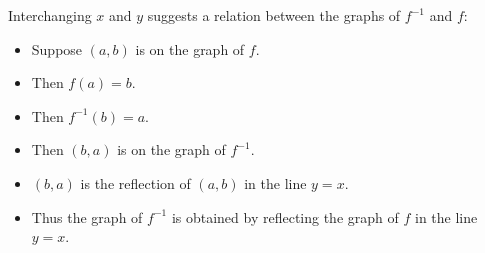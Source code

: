 \begin{frame}
\footnotesize
Interchanging $x$ and $y$ suggests a relation between the graphs of $f^{-1}$ and $f$:
\begin{itemize}
\item<2->  Suppose $(a,b)$ is on the graph of $f$.
\item<3->  Then $f(a) = b$.
\item<4->  Then $f^{-1}(b) = a$.
\item<5->  Then $(b,a)$ is on the graph of $f^{-1}$.
\item<6->  $(b,a)$ is the reflection of $(a,b)$ in the line $y = x$.
\item<7->  Thus the graph of $f^{-1}$ is obtained by reflecting the graph of $f$ in the line $y = x$.
\end{itemize}
\end{frame}
